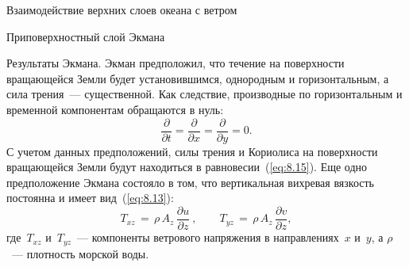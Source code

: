\begin{chapter}{Взаимодействие верхних слоев океана с ветром}
\begin{section}{Приповерхностный слой Экмана}
\begin{paragraph}{Результаты Экмана.}
Экман предположил, что течение на
поверхности вращающейся Земли будет установившимся, однородным и 
горизонтальным, а сила трения~--- существенной. Как следствие,
производные по горизонтальным и временной компонентам обращаются в нуль:
\begin{equation}
 \frac{\partial}{\partial{t}}=\frac{\partial}{\partial{x}}=\frac{\partial}{\partial{y}}=0.
\end{equation}
С учетом данных предположений, силы трения и Кориолиса 
на поверхности вращающейся Земли будут находиться 
в равновесии~(\ref{eq:8.15}). Еще одно предположение Экмана состояло в том, 
что вертикальная вихревая вязкость постоянна и имеет вид~(\ref{eq:8.13}):
\begin{equation}\label{eq:9.7}
 T_{xz} \,=\,\rho\, A_z \,\frac{\partial{u}}{\partial{z}}\: , \qquad 
 T_{yz} \,=\,\rho\, A_z \,\frac{\partial{v}}{\partial{z}},
\end{equation}
где~$T_{xz}$ и~$T_{yz}$~--- компоненты ветрового напряжения
 в направлениях~$x$ и~$y$,
а $\rho$~--- плотность морской воды.
%


\end{paragraph}
\end{section}
\end{chapter}
